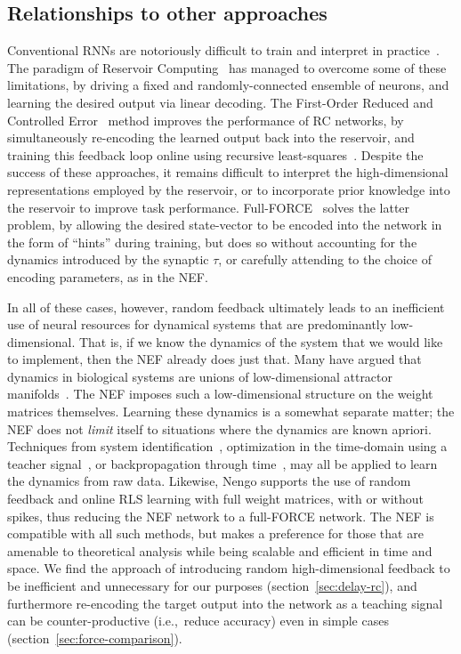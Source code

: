 \subsection{Relationships to other approaches}
\label{sec:relationships}

Conventional RNNs are notoriously difficult to train and interpret in practice~\citep{bengio1994learning}.
The paradigm of Reservoir Computing~\citep[RC;][]{jaeger2001echo, maass2002real} has managed to overcome some of these limitations, by driving a fixed and randomly-connected ensemble of neurons, and learning the desired output via linear decoding.
The First-Order Reduced and Controlled Error~\citep[FORCE;][]{sussillo2009generating} method improves the performance of RC networks, by simultaneously re-encoding the learned output back into the reservoir, and training this feedback loop online using recursive least-squares~\citep[RLS;][]{haykin1991adaptive}.
Despite the success of these approaches, it remains difficult to interpret the high-dimensional representations employed by the reservoir, or to incorporate prior knowledge into the reservoir to improve task performance.
Full-FORCE~\citep{depasquale2018full} solves the latter problem, by allowing the desired state-vector to be encoded into the network in the form of ``hints'' during training, but does so without accounting for the dynamics introduced by the synaptic $\tau$, or carefully attending to the choice of encoding parameters, as in the NEF.

In all of these cases, however, random feedback ultimately leads to an inefficient use of neural resources for dynamical systems that are predominantly low-dimensional.
That is, if we know the dynamics of the system that we would like to implement, then the NEF already does just that.
Many have argued that dynamics in biological systems are unions of low-dimensional attractor manifolds~\citep{sussillo2013opening, cunningham2014dimensionality, waernberg2017low}.
The NEF imposes such a low-dimensional structure on the weight matrices themselves.
Learning these dynamics is a somewhat separate matter; the NEF does not \emph{limit} itself to situations where the dynamics are known apriori.
Techniques from system identification~\citep{nelles2013nonlinear}, optimization in the time-domain using a teacher signal~\citep{duggins2017incorporating}, or backpropagation through time~\citep{rasmussen2018nengodl}, may all be applied to learn the dynamics from raw data.
Likewise, Nengo supports the use of random feedback and online RLS learning with full weight matrices, with or without spikes, thus reducing the NEF network to a full-FORCE network.
The NEF is compatible with all such methods, but makes a preference for those that are amenable to theoretical analysis while being scalable and efficient in time and space.
We find the approach of introducing random high-dimensional feedback to be inefficient and unnecessary for our purposes (section~\ref{sec:delay-rc}), and furthermore re-encoding the target output into the network as a teaching signal can be counter-productive (i.e.,~reduce accuracy) even in simple cases (section~\ref{sec:force-comparison}).

